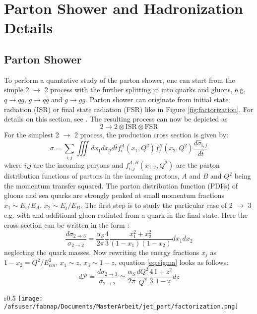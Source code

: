 \chapter{Parton Shower and Hadronization Details}
\section{Parton Shower}
To perform a quantative study of the parton shower, one can start from the simple 2 $\to$ 2 process with the further splitting in into quarks and gluons, e.g. $q\to qg$, $g\to q\bar{q}$ and $g\to gg$. Parton shower can originate from initial state radiation (ISR) or final state radiation (FSR) like in Figure \ref{fig:factorization}. For details on this section, see \cite{partonshower}. 
The resulting process can now be depicted as $$2 \to 2 \otimes \textrm{ISR} \otimes \textrm{FSR}$$   
For the simplest 2 $\to$ 2 process, the production cross section is given by:
$$\sigma = \sum_{i,j}\iiint dx_1 dx_2 d\hat t f_i^A(x_1,Q^2)f_j^B(x_2,Q^2)\frac{d\hat{\sigma}_{i,j}}{d\hat{t}} $$
where $i$,$j$ are the incoming partons and $f_{i,j}^{A,B}(x_{1,2},Q^2)$ are the parton distribution functions of partons in the incoming protons, $A$ and $B$ and $Q^2$ being the momentum transfer squared.
The parton distribution function (PDFs) of gluons and sea quarks are strongly peaked at small momentum fractions $x_1 \sim E_i/E_A$, $x_2 \sim E_j/E_B$.  
The first step is to study the particular case of 2 $\to$ 3 e.g. with and additional gluon radiated from a quark in the final state.
Here the cross section can be written in the form \cite{halzenmartin}:
\begin{equation}
\frac{d\sigma_{2\to3}}{\sigma_{2\to2}}=\frac{\alpha_S}{2\pi}\frac{4}{3}\frac{x_1^2+x_2^2}{(1-x_1)(1-x_2)}dx_1dx_2
\end{equation}
\label{eq:sigma}
neglecting the quark masses. Now rewriting the energy fractions $x_j$ as $1-x_2=Q^2/E_{cm}^2$, $x_1\sim z$, $x_3 \sim 1-z$, equation \ref{eq:sigma} looks as follows:
$$d\mathcal{P}=\frac{d\sigma_{2\to3}}{\sigma_{2\to2}}\simeq \frac{\alpha_S}{2\pi} \frac{dQ^2}{Q^2}\frac{4}{3}\frac{1+z^2}{1-z}dz$$
\begin{wrapfigure}{r}{0.5\textwidth}
  \centering
      \texttt{[image: /afsuser/fabnap/Documents/MasterArbeit/jet\_part/factorization.png]}
  \caption{Example of factorization of 2$\to n$ process.}
  \label{fig:factorization}
\end{wrapfigure}

